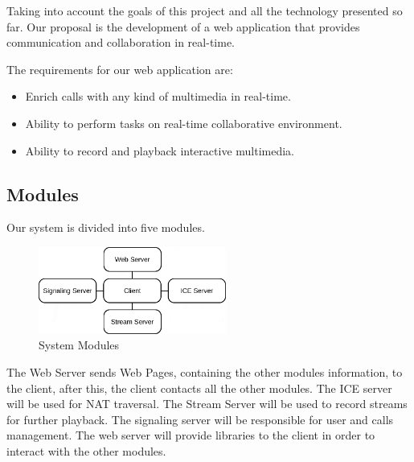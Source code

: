 Taking into account the goals of this project and all the technology presented so far. Our proposal is the development of a web application that provides communication and collaboration in real-time.

The requirements for our web application are:

\begin{itemize}
\item Enrich calls with any kind of multimedia in real-time.
 \item Ability to perform tasks on real-time collaborative environment.
 \item Ability to record and playback interactive multimedia.
\end{itemize}

\subsection{Modules}
	Our system is divided into five modules.

\begin{figure}[H]
	\centering
	\includegraphics[width=0.55\textwidth]{figures/archs.png}
	\caption{System Modules}
        \label{fig:modules}
\end{figure}

 The Web Server sends Web Pages, containing the other modules information, to the client, after this, the client contacts all the other modules. The ICE server will be used for \ac{NAT} traversal. The Stream Server will be used to record streams for further playback. The signaling server will be responsible for user and calls management. The web server will provide libraries to the client in order to interact with the other modules.  

